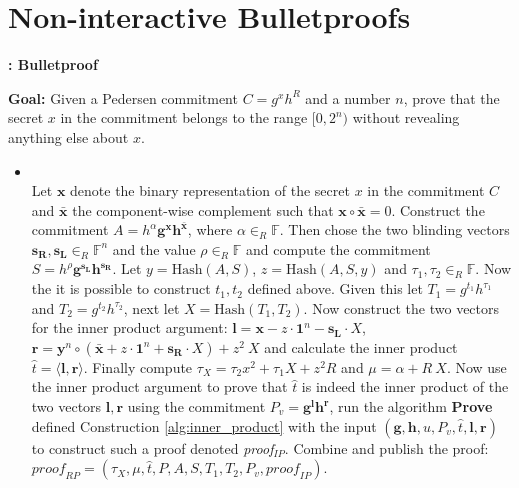 \chapter{Non-interactive Bulletproofs}
\label{Appendix:Bulletproof}

\begin{algorithm}[]
\caption{\textbf{: Bulletproof}}
\textbf{Goal:}  Given a Pedersen commitment $C=g^x h^R$ and a number $n$, prove that the secret $x$ in the commitment belongs to the range  $[0,2^n)$ without revealing anything else about $x$.
\vspace{2pt}
\hline
\vspace{2pt}
\begin{itemize}
\item{}\\
Let $\bm{x}$ denote the binary representation of the secret $x$ in the commitment $C$ and $\bar{\bm{x}}$ the component-wise complement such  that $\bm{x}\circ \bar{\bm{x}} = 0$. Construct the commitment $A= h^{\alpha} \bm{g}^{ \bm{x} } \bm{h}^{ \bar{\bm{x}} }$, where $\alpha \in_R \mathds{F}$. Then chose the two blinding vectors $\bm{s_R},\bm{s_L}\in_R\mathds{F}^n$ and the value $\rho\in_R\mathds{F}$ and compute the commitment $S=h^{\rho} \bm{g}^{\bm{s_L}} \bm{h}^{\bm{s_R}}$. Let $y=\text{Hash}(A,S)$, $z=\text{Hash}(A,S,y)$ and $\tau_1,\tau_2\in_R\mathds{F}$. Now the it is possible to construct $t_1,t_2$ defined above. Given this let $T_1=g^{t_1}h^{\tau_1}$ and $T_2=g^{t_2}h^{\tau_2}$, next let $X=\text{Hash}(T_1,T_2)$. Now construct the two vectors for the inner product argument: $\bm{l} = \bm{x}-z\cdot \bm{1}^n-\bm{s_L}\cdot X$, $\bm{r}= \bm{y}^n\circ(\bar{\bm{x}}+ z\cdot \bm{1}^n+\bm{s_R}\cdot X ) + z^2\ X $ and calculate the inner product $\hat{t} = \langle \bm{l},\bm{r}\rangle$. Finally compute $\tau_X = \tau_2 x^2 + \tau_1 X + z^2 R$ and $\mu = \alpha+ R\:X$.  Now use the inner product argument to prove that $\hat{t}$ is indeed the inner product of the two vectors $\mathbf{l},\mathbf{r}$ using the commitment $P_v = \bm{g}^{\bm{l}}\bm{h}^{\bm{r}}$, run the algorithm  \textbf{Prove}  defined Construction \ref{alg:inner_product} with the input $(\bm{g},\bm{h},u,P_v,\hat{t},\bm{l},\bm{r})$ to construct such a proof denoted  \textit{proof$_{IP}$}. Combine and publish  the proof: $\textit{proof}_{RP} = (\tau_X, \mu , \hat{t}, P, A, S, T_1, T_2 , P_v ,\textit{proof}_{IP}) $.


\end{itemize}
\end{algorithm}
